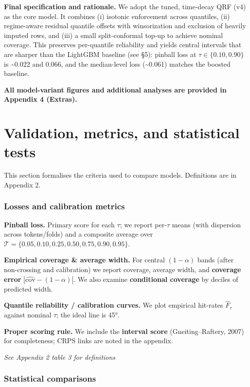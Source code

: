 \documentclass[
  a4paper,
  DIV=11,
  numbers=noendperiod]{scrreprt}
\begin{document}
\textbf{Final specification and rationale.} We adopt the tuned,
time-decay QRF (v4) as the core model. It combines (i) isotonic
enforcement across quantiles, (ii) regime-aware residual quantile
offsets with winsorization and exclusion of heavily imputed rows, and
(iii) a small split-conformal top-up to achieve nominal coverage. This
preserves per-quantile reliability and yields central intervals that are
sharper than the LightGBM baseline (see §5): pinball loss at
\(\tau\in\{0.10,0.90\}\) is \textasciitilde0.022 and 0.066, and the
median-level loss (\textasciitilde0.061) matches the boosted baseline.

\textbf{All model-variant figures and additional analyses are provided
in Appendix 4 (Extras).}

\section{Validation, metrics, and statistical
tests}\label{validation-metrics-and-statistical-tests}

This section formalises the criteria used to compare models. Definitions
are in Appendix 2.

\subsubsection{Losses and calibration
metrics}\label{losses-and-calibration-metrics}

\textbf{Pinball loss.} Primary score for each \(\tau\); we report
per-\(\tau\) means (with dispersion across tokens/folds) and a composite
average over \(\mathcal T=\{0.05,0.10,0.25,0.50,0.75,0.90,0.95\}\).

\textbf{Empirical coverage \& average width.} For central \((1-\alpha)\)
bands (after non-crossing and calibration) we report coverage, average
width, and \textbf{coverage error}
\(|\widehat{\mathrm{cov}}-(1-\alpha)|\). We also examine
\textbf{conditional coverage} by deciles of predicted width.

\textbf{Quantile reliability / calibration curves.} We plot empirical
hit-rates \(\widehat F_\tau\) against nominal \(\tau\); the ideal line
is 45°.

\textbf{Proper scoring rule.} We include the \textbf{interval score}
(Gneiting--Raftery, 2007) for completeness; CRPS links are noted in the
appendix.

\emph{See Appendix 2 table 3 for definitions}

\subsubsection{Statistical comparisons}\label{statistical-comparisons}
\end{document}
